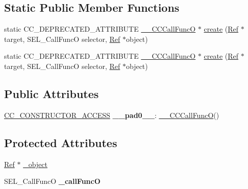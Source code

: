 \subsection*{Static Public Member Functions}
\begin{DoxyCompactItemize}
\item 
static C\+C\+\_\+\+D\+E\+P\+R\+E\+C\+A\+T\+E\+D\+\_\+\+A\+T\+T\+R\+I\+B\+U\+TE \hyperlink{class____CCCallFuncO}{\+\_\+\+\_\+\+C\+C\+Call\+FuncO} $\ast$ \hyperlink{class____CCCallFuncO_ad617de0f264ccc8d5450507bd4e0f3f1}{create} (\hyperlink{classRef}{Ref} $\ast$target, S\+E\+L\+\_\+\+Call\+FuncO selector, \hyperlink{classRef}{Ref} $\ast$object)
\item 
static C\+C\+\_\+\+D\+E\+P\+R\+E\+C\+A\+T\+E\+D\+\_\+\+A\+T\+T\+R\+I\+B\+U\+TE \hyperlink{class____CCCallFuncO}{\+\_\+\+\_\+\+C\+C\+Call\+FuncO} $\ast$ \hyperlink{class____CCCallFuncO_abed2b1821bb83ebb41d8404b2ccf63b0}{create} (\hyperlink{classRef}{Ref} $\ast$target, S\+E\+L\+\_\+\+Call\+FuncO selector, \hyperlink{classRef}{Ref} $\ast$object)
\end{DoxyCompactItemize}
\subsection*{Public Attributes}
\begin{DoxyCompactItemize}
\item 
\mbox{\label{class____CCCallFuncO_ad164f2a04950a9c5d6aa126b6b0f47e9}} 
\hyperlink{_2cocos2d_2cocos_2base_2ccConfig_8h_a25ef1314f97c35a2ed3d029b0ead6da0}{C\+C\+\_\+\+C\+O\+N\+S\+T\+R\+U\+C\+T\+O\+R\+\_\+\+A\+C\+C\+E\+SS} {\bfseries \+\_\+\+\_\+pad0\+\_\+\+\_\+}\+: \hyperlink{class____CCCallFuncO}{\+\_\+\+\_\+\+C\+C\+Call\+FuncO}()
\end{DoxyCompactItemize}
\subsection*{Protected Attributes}
\begin{DoxyCompactItemize}
\item 
\hyperlink{classRef}{Ref} $\ast$ \hyperlink{class____CCCallFuncO_a445f552253c55eb32d26138ca02632e3}{\+\_\+object}
\item 
\mbox{\label{class____CCCallFuncO_a5dc397aa67a0439a7b21170645aacf40}} 
S\+E\+L\+\_\+\+Call\+FuncO {\bfseries \+\_\+call\+FuncO}
\end{DoxyCompactItemize}
